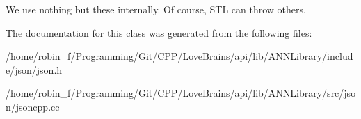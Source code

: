 We use nothing but these internally. Of course, S\+T\+L can throw others. 

The documentation for this class was generated from the following files\+:\begin{DoxyCompactItemize}
\item 
/home/robin\+\_\+f/\+Programming/\+Git/\+C\+P\+P/\+Love\+Brains/api/lib/\+A\+N\+N\+Library/include/json/json.\+h\item 
/home/robin\+\_\+f/\+Programming/\+Git/\+C\+P\+P/\+Love\+Brains/api/lib/\+A\+N\+N\+Library/src/json/jsoncpp.\+cc\end{DoxyCompactItemize}
